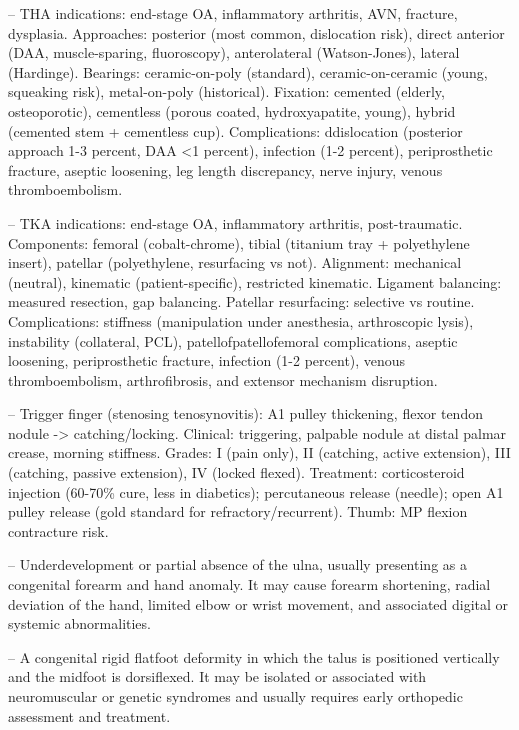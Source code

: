 -- THA indications: end-stage OA, inflammatory arthritis, AVN, fracture, dysplasia. Approaches: posterior (most common, dislocation risk), direct anterior (DAA, muscle-sparing, fluoroscopy), anterolateral (Watson-Jones), lateral (Hardinge). Bearings: ceramic-on-poly (standard), ceramic-on-ceramic (young, squeaking risk), metal-on-poly (historical). Fixation: cemented (elderly, osteoporotic), cementless (porous coated, hydroxyapatite, young), hybrid (cemented stem + cementless cup). Complications: ddislocation (posterior approach 1-3 percent, DAA <1 percent), infection (1-2 percent), periprosthetic fracture, aseptic loosening, leg length discrepancy, nerve injury, venous thromboembolism.

-- TKA indications: end-stage OA, inflammatory arthritis, post-traumatic. Components: femoral (cobalt-chrome), tibial (titanium tray + polyethylene insert), patellar (polyethylene, resurfacing vs not). Alignment: mechanical (neutral), kinematic (patient-specific), restricted kinematic. Ligament balancing: measured resection, gap balancing. Patellar resurfacing: selective vs routine. Complications: stiffness (manipulation under anesthesia, arthroscopic lysis), instability (collateral, PCL), patellofpatellofemoral complications, aseptic loosening, periprosthetic fracture, infection (1-2 percent), venous thromboembolism, arthrofibrosis, and extensor mechanism disruption.

-- Trigger finger (stenosing tenosynovitis): A1 pulley thickening, flexor tendon nodule -> catching/locking. Clinical: triggering, palpable nodule at distal palmar crease, morning stiffness. Grades: I (pain only), II (catching, active extension), III (catching, passive extension), IV (locked flexed). Treatment: corticosteroid injection (60-70\% cure, less in diabetics); percutaneous release (needle); open A1 pulley release (gold standard for refractory/recurrent). Thumb: MP flexion contracture risk.

-- Underdevelopment or partial absence of the ulna, usually presenting as a congenital forearm and hand anomaly. It may cause forearm shortening, radial deviation of the hand, limited elbow or wrist movement, and associated digital or systemic abnormalities.

-- A congenital rigid flatfoot deformity in which the talus is positioned vertically and the midfoot is dorsiflexed. It may be isolated or associated with neuromuscular or genetic syndromes and usually requires early orthopedic assessment and treatment.

